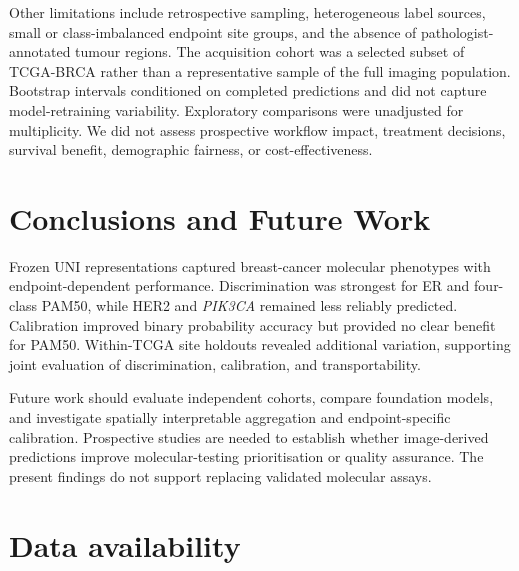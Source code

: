 \documentclass[pdflatex]{cas-dc}
\theoremstyle{remark}
\theoremstyle{plain}
\begin{document}
Other limitations include retrospective sampling, heterogeneous label sources, small or class-imbalanced endpoint site groups, and the absence of pathologist-annotated tumour regions. The acquisition cohort was a selected subset of TCGA-BRCA rather than a representative sample of the full imaging population. Bootstrap intervals conditioned on completed predictions and did not capture model-retraining variability. Exploratory comparisons were unadjusted for multiplicity. We did not assess prospective workflow impact, treatment decisions, survival benefit, demographic fairness, or cost-effectiveness.




\section{Conclusions and Future Work}
\label{sec:conclusion}

Frozen UNI representations captured breast-cancer molecular phenotypes with endpoint-dependent performance. Discrimination was strongest for ER and four-class PAM50, while HER2 and \textit{PIK3CA} remained less reliably predicted. Calibration improved binary probability accuracy but provided no clear benefit for PAM50. Within-TCGA site holdouts revealed additional variation, supporting joint evaluation of discrimination, calibration, and transportability.

Future work should evaluate independent cohorts, compare foundation models, and investigate spatially interpretable aggregation and endpoint-specific calibration. Prospective studies are needed to establish whether image-derived predictions improve molecular-testing prioritisation or quality assurance. The present findings do not support replacing validated molecular assays.

\section*{Data availability}
\end{document}
